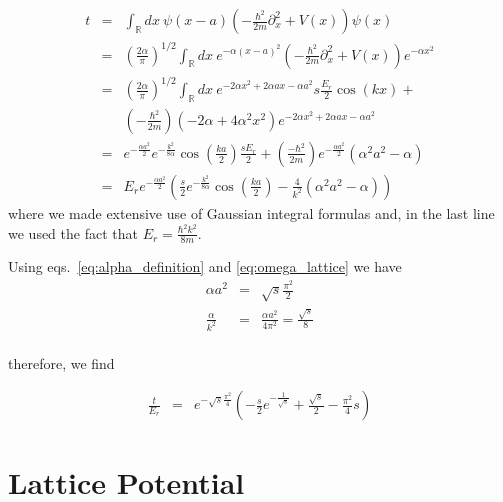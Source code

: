 \documentclass{article}
\theoremstyle{definition}
\begin{document}
\begin{eqnarray}
t &=& \int_\mathbb{R} dx \ \psi(x - a) \left(- \frac{\hbar^2}{2m} \partial_x^2 + V(x) \right) \psi(x) \\
&=& \left(\frac{2 \alpha}{\pi} \right)^{1/2} \int_\mathbb{R} dx \ e^{-\alpha (x-a)^2} \left(- \frac{\hbar^2}{2m} \partial_x^2 + V(x) \right) e^{-\alpha x^2}\\
&=& \left(\frac{2 \alpha}{\pi} \right)^{1/2} \int_\mathbb{R} dx \  e^{-2 \alpha x^2 + 2 \alpha a x - \alpha a^2} s \frac{E_r}{2} \cos(kx) + \nonumber \\
&& \left( - \frac{\hbar^2}{2m} \right) \left( -2 \alpha + 4 \alpha^2 x^2 \right) e^{-2 \alpha x^2 + 2 \alpha a x - \alpha a^2} \\
&=& e^{-\frac{\alpha a^2}{2}} e^{- \frac{k^2}{8 \alpha}} \cos\left(\frac{ka}{2} \right) \frac{s E_r}{2} + \left(\frac{-\hbar^2}{2m} \right) e^{- \frac{\alpha a^2}{2}} \left(\alpha^2 a^2 - \alpha \right) \\
&=& E_r e^{-\frac{\alpha a^2}{2}} \left(\frac{s}{2} e^{- \frac{k^2}{8 \alpha}} \cos \left(\frac{ka}{2} \right) - \frac{4}{k^2} (\alpha^2 a^2 - \alpha) \right)
\end{eqnarray}
where we made extensive use of Gaussian integral formulas and, in the last line we used the fact that $E_r = \frac{\hbar^2 k^2}{8 m}$.

Using eqs.~\ref{eq:alpha_definition} and \ref{eq:omega_lattice} we have
\begin{eqnarray}
\alpha a^2 &=& \sqrt{s} \frac{\pi^2}{2}\\
\frac{\alpha}{k^2} &=& \frac{\alpha a^2}{4\pi^2} = \frac{\sqrt{s}}{8} \\
\end{eqnarray}

therefore, we find

\begin{eqnarray}
\frac{t}{E_r} &=& e^{-\sqrt{s} \frac{\pi^2}{4}} \left(-\frac{s}{2} e^{-\frac{1}{\sqrt{s}}} + \frac{\sqrt{s}}{2} - \frac{\pi^2}{4}s \right)
\end{eqnarray}

\section{Lattice Potential}
\end{document}
